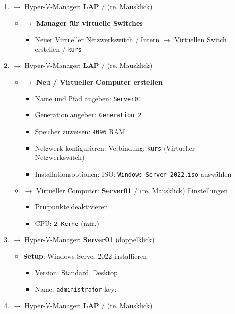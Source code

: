 \begin{enumerate}
\item
  $\to$ Hyper-V-Manager: \textbf{LAP} / (re. Mausklick)

  \begin{itemize}
  \item
    $\to$ \textbf{Manager für virtuelle Switches}

    \begin{itemize}
    \item
      Neuer Virtueller Netzwerkswitch / Intern $\to$ Virtuellen Switch
      erstellen / \verb|kurs|
    \end{itemize}
  \end{itemize}
\item
  $\to$ Hyper-V-Manager: \textbf{LAP} / (re. Mausklick)

  \begin{itemize}
  \item
    $\to$ \textbf{Neu / Virtueller Computer erstellen}

    \begin{itemize}
    \item
      Name und Pfad angeben: \verb|Server01|
    \item
      Generation angeben: \verb|Generation 2|
    \item
      Speicher zuweisen: \verb|4096| RAM
    \item
      Netzwerk konfigurieren: Verbindung: \verb|kurs|
      (Virtueller Netzwerkswitch)
    \item
      Installationsoptionen: ISO:
      \verb|Windows Server 2022.iso| auswählen
    \end{itemize}
  \item
    $\to$ Virtueller Computer: \textbf{Server01} / (re. Mausklick)
    Einstellungen

    \begin{itemize}
    \item
      Prüfpunkte deaktivieren
    \item
      CPU: \verb|2 Kerne| (min.)
    \end{itemize}
  \end{itemize}
\item
  $\to$ Hyper-V-Manager: \textbf{Server01} (doppelklick)

  \begin{itemize}
  \item
    \textbf{Setup}: Windows Server 2022 installieren

    \begin{itemize}
    \item
      Version: Standard, Desktop
    \item
      Name: \verb|administrator| key:
    \end{itemize}
  \end{itemize}
\item
  $\to$ Hyper-V-Manager: \textbf{LAP} / (re. Mausklick)


\end{enumerate}
